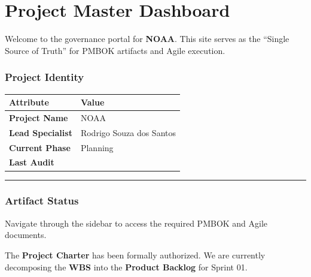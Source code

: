 \documentclass[
]{report}
\author{}
\date{}
\newcounter{none} %
\begin{document}
\newcommand{\theProjectName}{NOAA}
\newcommand{\theAuthor}{Rodrigo Souza dos Santos}

\chapter{Project Master Dashboard}\label{project-master-dashboard}

Welcome to the governance portal for \textbf{NOAA}. This site serves as
the ``Single Source of Truth'' for PMBOK artifacts and Agile execution.

\subsection{Project Identity}\label{project-identity}

{\def\LTcaptype{none} %
\begin{longtable}[]{@{}
  >{\raggedright\arraybackslash}p{}
  >{\raggedright\arraybackslash}p{}@{}}
\toprule\noalign{}
\begin{minipage}[b]{\linewidth}\raggedright
Attribute
\end{minipage} & \begin{minipage}[b]{\linewidth}\raggedright
Value
\end{minipage} \\
\midrule\noalign{}
\endhead
\bottomrule\noalign{}
\endlastfoot
\textbf{Project Name} & NOAA \\
\textbf{Lead Specialist} & Rodrigo Souza dos Santos \\
\textbf{Current Phase} & {Planning} \\
\textbf{Last Audit} & \\
\end{longtable}
}

\begin{center}\rule{0.5\linewidth}{0.5pt}\end{center}

\subsection{Artifact Status}\label{artifact-status}

Navigate through the sidebar to access the required PMBOK and Agile
documents.

The \textbf{Project Charter} has been formally authorized. We are
currently decomposing the \textbf{WBS} into the \textbf{Product Backlog}
for Sprint 01.
\end{document}
